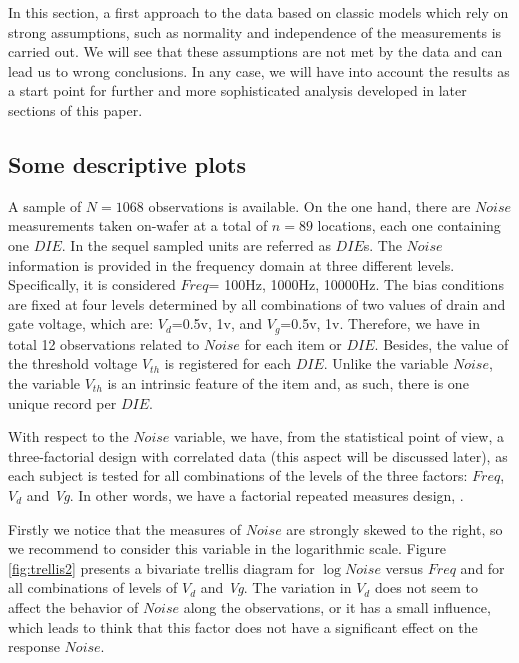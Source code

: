 \documentclass[sn-mathphys]{sn-jnl}%
\theoremstyle{thmstyleone}%
\theoremstyle{thmstyletwo}%
\theoremstyle{thmstylethree}%
\begin{document}
In this section, a first approach to the data based on classic models which rely on strong assumptions, such as normality and independence of the measurements is carried out. We will see that these assumptions are not met by the data and can lead us to wrong conclusions. In any case, we will have into account the results as a start point for further and more sophisticated analysis developed in later sections of this paper.

\subsection{Some descriptive plots}
A sample of $N = 1068$ observations is available. On the one hand, there are $Noise$ measurements taken on-wafer at a total of $n=89$ locations, each one containing one  $DIE$. In the sequel sampled units are referred as $DIE$s. The $Noise$ information is provided in the frequency domain at three different levels. Specifically, it is considered $Freq$= 100Hz, 1000Hz, 10000Hz. The bias conditions are fixed at four levels determined by all combinations of two values of drain and gate voltage, which are: $V_d$=0.5v, 1v, and $V_g$=0.5v, 1v. Therefore, we have in total 12 observations related to $Noise$ for each item or $DIE$. Besides, the value of  the threshold voltage $V_{th}$ is registered for each $DIE$. Unlike the variable $Noise$, the variable $V_{th}$ is an intrinsic feature of the item and, as such, there is one unique record per $DIE$.

With respect to the $Noise$ variable, we have, from the statistical point of view, a three-factorial design with correlated data (this aspect will be discussed later), as each subject is tested for all combinations of the levels of the three factors: $Freq$, $V_d$ and {\it Vg}. In other words, we have a factorial repeated measures design, \cite{BHN2000}.

Firstly we notice that the measures of  $Noise$ are strongly skewed to the right, so we recommend to consider this variable in the logarithmic scale. Figure \ref{fig:trellis2} presents a bivariate trellis diagram for $\log Noise$ versus $Freq$ and for all combinations of levels of $V_d$ and {\it Vg}. The variation in $V_d$ does not seem to affect the behavior of $Noise$ along the observations, or it has a small influence, which leads to think that this factor does not have a significant effect on the response $Noise$.  
\end{document}
